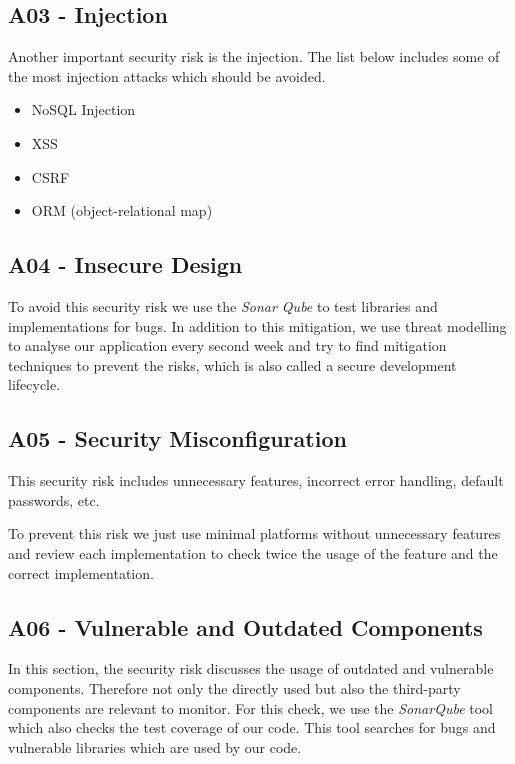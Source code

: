\subsection{A03 - Injection}
Another important security risk is the injection. The list below includes some of the most injection attacks which should be avoided.
\begin{itemize}
  \item NoSQL Injection
  \item XSS
  \item CSRF
  \item ORM (object-relational map)
\end{itemize}


\subsection{A04 - Insecure Design}
To avoid this security risk we use the \textit{Sonar Qube} to test libraries and implementations for bugs. In addition to this mitigation, we use threat modelling to analyse our application every second week and try to find mitigation techniques to prevent the risks, which is also called a secure development lifecycle.

\subsection{A05 - Security Misconfiguration}
This security risk includes unnecessary features, incorrect error handling, default passwords, etc.

To prevent this risk we just use minimal platforms without unnecessary features and review each implementation to check twice the usage of the feature and the correct implementation.

\subsection{A06 - Vulnerable and Outdated Components}
In this section, the security risk discusses the usage of outdated and vulnerable components. Therefore not only the directly used but also the third-party components are relevant to monitor. For this check, we use the \textit{SonarQube} tool which also checks the test coverage of our code. This tool searches for bugs and vulnerable libraries which are used by our code.

